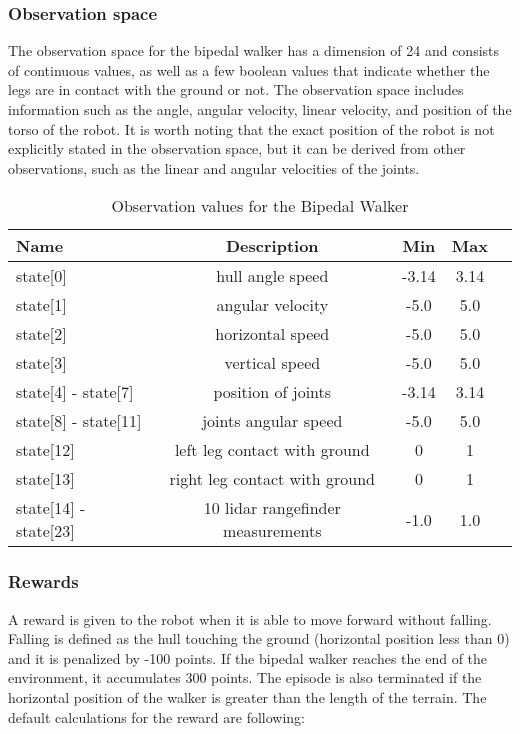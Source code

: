 \subsubsection{Observation space}
The observation space for the bipedal walker has a dimension of 24 and consists of continuous values, as well as a few boolean values that indicate whether the legs are in contact with the ground or not. The observation space includes information such as the angle, angular velocity, linear velocity, and position of the torso of the robot. It is worth noting that the exact position of the robot is not explicitly stated in the observation space, but it can be derived from other observations, such as the linear and angular velocities of the joints.

\begin{table}[!ht]
\centering
\caption{Observation values for the Bipedal Walker}
\begin{tabular}{lcccc}
\toprule
Name& Description& Min & Max \\
\midrule
state[0]             & hull angle speed                    & -3.14 & 3.14 \\
state[1]             & angular velocity                    & -5.0  & 5.0  \\
state[2]             & horizontal speed                    & -5.0  & 5.0  \\
state[3]             & vertical speed                      & -5.0  & 5.0  \\
state[4] - state[7]  & position of joints                  & -3.14 & 3.14 \\
state[8] - state[11] & joints angular speed                & -5.0  & 5.0  \\
state[12]            & left leg contact with ground        & 0     & 1    \\
state[13]            & right leg contact with ground       & 0     & 1    \\
state[14] - state[23]& 10 lidar rangefinder measurements   & -1.0  & 1.0  \\
\bottomrule

\end{tabular}
\end{table}%

\subsubsection{Rewards}
A reward is given to the robot when it is able to move forward without falling. Falling is defined as the hull touching the ground (horizontal position less than 0) and it is penalized by -100 points. If the bipedal walker reaches the end of the environment, it accumulates 300 points. The episode is also terminated if the horizontal position of the walker is greater than the length of the terrain. The default calculations for the reward are following:

